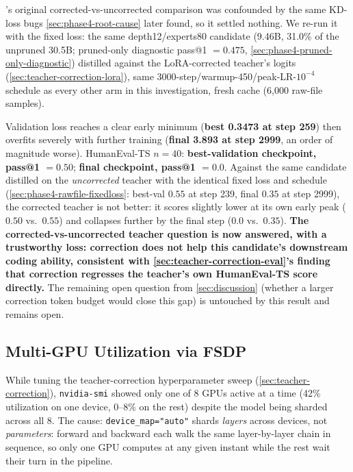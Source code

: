\documentclass{article}
\theoremstyle{plain}
\theoremstyle{definition}
\theoremstyle{remark}
\begin{document}
's original corrected-vs-uncorrected comparison
was confounded by the same KD-loss bugs \cref{sec:phase4-root-cause}
later found, so it settled nothing. We re-run it with the fixed loss:
the same depth12/experts80 candidate (9.46B, 31.0\% of the unpruned
30.5B; pruned-only diagnostic pass@1 $=0.475$,
\cref{sec:phase4-pruned-only-diagnostic}) distilled against the
LoRA-corrected teacher's logits (\cref{sec:teacher-correction-lora}),
same 3000-step/warmup-450/peak-LR-$10^{-4}$ schedule as every other arm
in this investigation, fresh cache (6,000 raw-file samples).

Validation loss reaches a clear early minimum (\textbf{best 0.3473 at
step 259}) then overfits severely with further training (\textbf{final
3.893 at step 2999}, an order of magnitude worse). HumanEval-TS $n{=}40$:
\textbf{best-validation checkpoint, pass@1 $=0.50$}; \textbf{final
checkpoint, pass@1 $=0.0$}. Against the same candidate distilled on the
\emph{uncorrected} teacher with the identical fixed loss and schedule
(\cref{sec:phase4-rawfile-fixedloss}: best-val $0.55$ at step 239, final
$0.35$ at step 2999), the corrected teacher is not better: it scores
slightly lower at its own early peak ($0.50$ vs.\ $0.55$) and collapses
further by the final step ($0.0$ vs.\ $0.35$). \textbf{The
corrected-vs-uncorrected teacher question is now answered, with a
trustworthy loss: correction does not help this candidate's downstream
coding ability, consistent with \cref{sec:teacher-correction-eval}'s
finding that correction regresses the teacher's own HumanEval-TS score
directly.} The remaining open question from \cref{sec:discussion}
(whether a larger correction token budget would close this gap) is
untouched by this result and remains open.

\subsection{Multi-GPU Utilization via FSDP}
\label{app:fsdp}

While tuning the teacher-correction hyperparameter sweep
(\cref{sec:teacher-correction}), \texttt{nvidia-smi} showed only one of
8 GPUs active at a time (42\% utilization on one device, 0--8\% on the
rest) despite the model being sharded across all 8. The cause:
\texttt{device\_map="auto"} shards \emph{layers} across devices, not
\emph{parameters}: forward and backward each walk the same
layer-by-layer chain in sequence, so only one GPU computes at any given
instant while the rest wait their turn in the pipeline.
\end{document}

